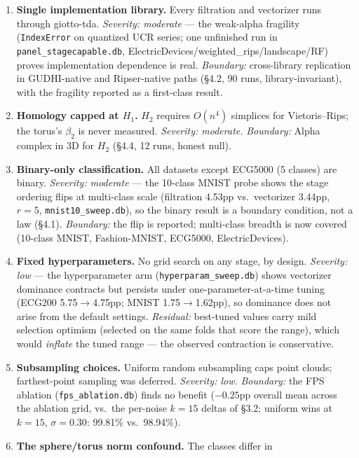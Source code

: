 \documentclass[12pt, a4paper]{report}
\theoremstyle{definition}
\theoremstyle{plain}
\theoremstyle{remark}
\begin{document}
\begin{enumerate}
  \item \textbf{Single implementation library.} Every filtration and
    vectorizer runs through giotto-tda. \emph{Severity: moderate} --- the
    weak-alpha fragility (\texttt{IndexError} on quantized UCR series;
    one unfinished run in \texttt{panel\_stagecapable.db},
    ElectricDevices/weighted\_rips/landscape/RF) proves implementation
    dependence is real. \emph{Boundary:} cross-library
    replication in GUDHI-native and Ripser-native paths (\S4.2, 90 runs, library-invariant), with the fragility reported as a first-class result.
  \item \textbf{Homology capped at $H_1$.} $H_2$ requires $O(n^4)$
    simplices for Vietoris--Rips; the torus's $\beta_2$ is never
    measured. \emph{Severity: moderate.} \emph{Boundary:}
    Alpha complex in 3D for $H_2$ (\S4.4, 12 runs, honest null).
  \item \textbf{Binary-only classification.} All datasets except ECG5000
    (5 classes) are binary. \emph{Severity: moderate} --- the 10-class
    MNIST probe shows the stage ordering flips at multi-class scale
    (filtration 4.53pp vs.\ vectorizer 3.44pp, $r{=}5$,
    \texttt{mnist10\_sweep.db}), so the binary result is a boundary
    condition, not a law (\S4.1). \emph{Boundary:} the flip is
    reported; multi-class breadth is now covered (10-class MNIST, Fashion-MNIST, ECG5000, ElectricDevices).
  \item \textbf{Fixed hyperparameters.} No grid search on any stage, by
    design. \emph{Severity: low} --- the hyperparameter arm
    (\texttt{hyperparam\_sweep.db}) shows vectorizer dominance contracts
    but persists under one-parameter-at-a-time tuning (ECG200
    5.75$\rightarrow$4.75pp; MNIST 1.75$\rightarrow$1.62pp), so dominance
    does not arise from the default settings. \emph{Residual:} best-tuned
    values carry mild selection optimism (selected on the same folds that
    score the range), which would \emph{inflate} the tuned range --- the
    observed contraction is conservative.
  \item \textbf{Subsampling choices.} Uniform random subsampling caps
    point clouds; farthest-point sampling was deferred. \emph{Severity:
    low.} \emph{Boundary:} the FPS ablation
    (\texttt{fps\_}\allowbreak\texttt{ablation.db}) finds no benefit ($-0.25$pp overall mean across the ablation grid, vs.\ the per-noise $k{=}15$ deltas of \S3.2;
    uniform wins at $k{=}15$, $\sigma{=}0.30$: 99.81\% vs.\ 98.94\%).
  \item \textbf{The sphere/torus norm confound.} The classes differ in

\end{enumerate}
\end{document}
